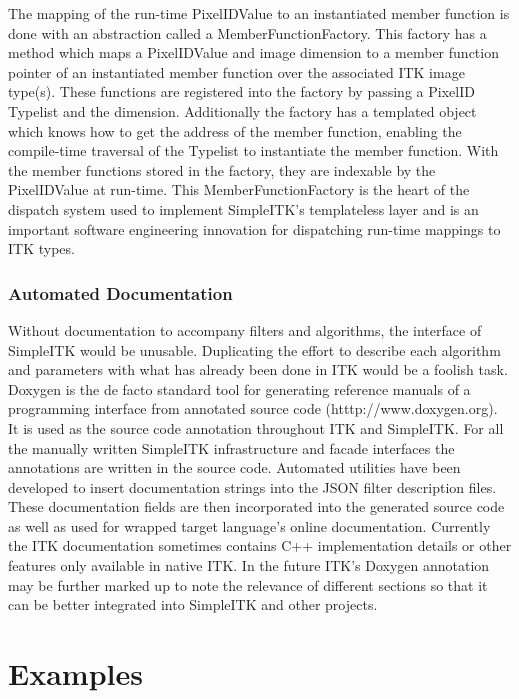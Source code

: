 \documentclass{frontiersMED} %
\begin{document}
The mapping of the run-time PixelIDValue to an instantiated member
function is done with an abstraction called a
MemberFunctionFactory. This factory has a method which maps a
PixelIDValue and image dimension to a member function pointer of an
instantiated member function over the associated ITK image
type(s). These functions are registered into the factory by passing a
PixelID Typelist and the dimension. Additionally the factory has a
templated object which knows how to get the address of  the member
function, enabling the compile-time traversal of the Typelist to
instantiate the member function.  With the member functions stored in
the factory, they are indexable by the PixelIDValue at run-time. This
MemberFunctionFactory is the heart of the dispatch system used to
implement SimpleITK’s templateless layer and is an important software
engineering innovation for dispatching run-time mappings to ITK types.

\subsubsection{Automated Documentation}
Without documentation to accompany filters and algorithms, the
interface of SimpleITK would be unusable. Duplicating the effort to
describe each algorithm and parameters with what has already been done
in ITK would be a foolish task. Doxygen is the de facto standard tool
for generating reference manuals of a programming interface from
annotated source code (htttp://www.doxygen.org). It is used as the source code annotation
throughout ITK and SimpleITK. For all the manually written SimpleITK
infrastructure and facade interfaces the annotations are written in
the source code. Automated utilities have been developed to insert
documentation strings into the JSON filter description files. These
documentation fields are then incorporated into the generated source
code as well as used for wrapped target language’s online
documentation. Currently the ITK documentation sometimes contains C++
implementation details or other features only available in native ITK.
In the future ITK’s Doxygen annotation may be further marked up to
note the relevance of different sections so that it can be better
integrated into SimpleITK and other projects.



\section{Examples}
\end{document}
